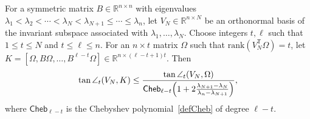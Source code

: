 \documentclass{siamart190516}
\newcommand{\Ttran}{\mathsf{T}}
\newcommand{\R}{\mathbb{R}}
\newcommand{\rk}{\mathrm{rank}}
\newcommand{\cheb}{\mathsf{Cheb}}
\begin{document}
\begin{lemma}
    \label{lemblk}
    For a symmetric matrix $B\in\R^{n\times n}$ with eigenvalues $\lambda_{1}<\lambda_{2}<\dotsb<\lambda_{N}<\lambda_{N+1}\leq \dotsb\leq \lambda_{n}$, let $V_{N} \in \R^{n\times N}$ be an orthonormal basis of the invariant subspace associated with $\lambda_1,\dotsc,\lambda_N$. Choose integers $t,\ell$ such that $1\leq t\leq N$ and $t\leq \ell\leq n$.
    For an $n\times t$ matrix $\Omega$ such that $\rk(V_{N}^{\Ttran}\Omega)=t$, let $K=[\Omega,B\Omega,\dotsc,B^{\ell-t}\Omega]\in\R^{n\times(\ell - t + 1)t}$. Then
    \begin{equation} \label{eq:lemblk}
        \tan\angle_{t}(V_{N},K)\leq \frac{\tan\angle_{t}(V_{N},\Omega)}{\cheb_{\ell-t}\Bigl(1+2 \frac{\lambda_{N+1}-\lambda_{N}}{\lambda_{n}-\lambda_{N+1}}\Bigr)},
    \end{equation}
    where $\cheb_{\ell-t}$ is the Chebyshev polynomial~\cref{defCheb} of degree $\ell - t$.
\end{lemma}    
\end{document}
